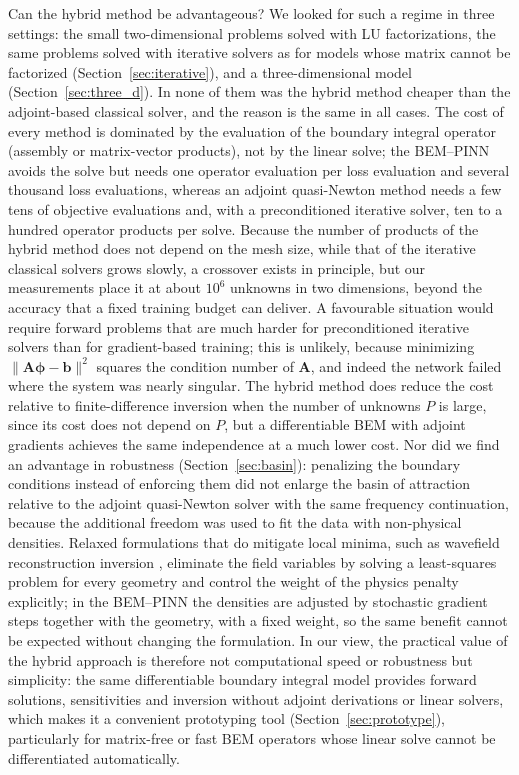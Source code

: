 \documentclass[11pt,twoside]{article}
\begin{document}
Can the hybrid method be advantageous? We looked for such a regime in three settings: the small two-dimensional problems solved with LU factorizations, the same problems solved with iterative solvers as for models whose matrix cannot be factorized (Section~\ref{sec:iterative}), and a three-dimensional model (Section~\ref{sec:three_d}). In none of them was the hybrid method cheaper than the adjoint-based classical solver, and the reason is the same in all cases. The cost of every method is dominated by the evaluation of the boundary integral operator (assembly or matrix-vector products), not by the linear solve; the BEM--PINN avoids the solve but needs one operator evaluation per loss evaluation and several thousand loss evaluations, whereas an adjoint quasi-Newton method needs a few tens of objective evaluations and, with a preconditioned iterative solver, ten to a hundred operator products per solve. Because the number of products of the hybrid method does not depend on the mesh size, while that of the iterative classical solvers grows slowly, a crossover exists in principle, but our measurements place it at about $10^6$ unknowns in two dimensions, beyond the accuracy that a fixed training budget can deliver. A favourable situation would require forward problems that are much harder for preconditioned iterative solvers than for gradient-based training; this is unlikely, because minimizing $\|\mathbf{A}\boldsymbol{\phi}-\mathbf{b}\|^2$ squares the condition number of $\mathbf{A}$, and indeed the network failed where the system was nearly singular. The hybrid method does reduce the cost relative to finite-difference inversion when the number of unknowns $P$ is large, since its cost does not depend on $P$, but a differentiable BEM with adjoint gradients achieves the same independence at a much lower cost. Nor did we find an advantage in robustness (Section~\ref{sec:basin}): penalizing the boundary conditions instead of enforcing them did not enlarge the basin of attraction relative to the adjoint quasi-Newton solver with the same frequency continuation, because the additional freedom was used to fit the data with non-physical densities. Relaxed formulations that do mitigate local minima, such as wavefield reconstruction inversion \citep{vanLeeuwen2013}, eliminate the field variables by solving a least-squares problem for every geometry and control the weight of the physics penalty explicitly; in the BEM--PINN the densities are adjusted by stochastic gradient steps together with the geometry, with a fixed weight, so the same benefit cannot be expected without changing the formulation. In our view, the practical value of the hybrid approach is therefore not computational speed or robustness but simplicity: the same differentiable boundary integral model provides forward solutions, sensitivities and inversion without adjoint derivations or linear solvers, which makes it a convenient prototyping tool (Section~\ref{sec:prototype}), particularly for matrix-free or fast BEM operators whose linear solve cannot be differentiated automatically.
\end{document}
